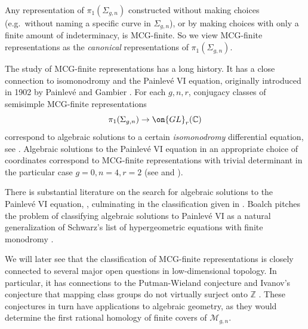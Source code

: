 \documentclass[12 pt]{amsart}
\theoremstyle{plain}
\theoremstyle{definition}
\theoremstyle{remark}
\numberwithin{equation}{section}
\begin{document}
Any representation of $\pi_1(\Sigma_{g,n})$ constructed without making choices
(e.g.~without naming a specific curve in $\Sigma_{g,n}$),
or by making choices with only a finite amount of indeterminacy, is MCG-finite.
So we view MCG-finite representations 
as the \emph{canonical} representations of $\pi_1(\Sigma_{g,n})$. 

The study of MCG-finite
representations has a long history.
It has a close
connection to isomonodromy and the Painlev\'e VI equation,
originally introduced in 1902 by Painlev\'e 
\cite{painleve:on-the-differential-equations-of-sectond-order}
and Gambier
\cite{gambier:on-the-differential-equations-of-second-order}.
For each $g,n,r$, conjugacy classes of semisimple MCG-finite representations 
$$\pi_1(\Sigma_{g,n})\to \on{GL}_r(\mathbb{C})$$ correspond to algebraic solutions
to a certain \emph{isomonodromy} differential equation, see \cite[Theorem A]{CH:isomonodromic}. 
Algebraic solutions to the Painlev\'e VI equation in an appropriate choice of coordinates 
correspond to MCG-finite representations with trivial determinant in
the particular case $g=0, n=4, r=2$ (see
\cite[\S1-\S3]{mahoux:itroduction-to-the-theory-of-isomonodromic-deformations}
and \cite[\S2]{doran:isomonodromic}). 

There is substantial literature on the
search for algebraic solutions 
to the Painlev\'e VI equation,
\cite{andreev2002transformations, boalch2005klein, boalch2006fifty, boalchsome, boalch2007higher, cantat2009holomorphic, dubrovin1996geometry, dubrovin2000monodromy, hitchin1996poncelet, hitchin2003lecture, kitaev2006grothendieck, kitaev2005remarks},
culminating in the classification given in \cite{lisovyy2014algebraic}. Boalch \cite{boalch2007towards} pitches the problem of classifying algebraic solutions to Painlev\'e VI as a natural generalization of Schwarz's list of hypergeometric equations with finite monodromy \cite{schwarz1873ueber}.

We will later see that the classification of MCG-finite representations is
closely connected to several major open questions in low-dimensional topology.
In particular, it has connections to the Putman-Wieland conjecture
\cite[Conjecture 1.2]{putmanW:abelian-quotients} and Ivanov's conjecture that mapping class groups do not virtually surject onto $\mathbb{Z}$ \cite[\S7]{Ivanov:problems}.
These conjectures in turn have applications to algebraic geometry, as they would
determine the first rational homology of finite covers of $\mathscr M_{g,n}$.
\end{document}
